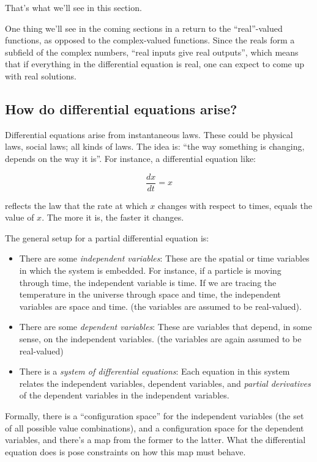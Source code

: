 \documentclass[a4paper]{amsart}
\begin{document}
That's what we'll see in this section.

One thing we'll see in the coming sections in a return to the
``real''-valued functions, as opposed to the complex-valued
functions. Since the reals form a subfield of the complex numbers,
``real inputs give real outputs'', which means that if everything in
the differential equation is real, one can expect to come up with real
solutions.

\subsection{How do differential equations arise?}

Differential equations arise from instantaneous laws. These could be
physical laws, social laws; all kinds of laws. The idea is: ``the way
something is changing, depends on the way it is''. For instance, a
differential equation like:

$$\frac{dx}{dt} = x$$

reflects the law that the rate at which $x$ changes with respect to
times, equals the value of $x$. The more it is, the faster it changes.

The general setup for a partial differential equation is:

\begin{itemize}

\item There are some {\em independent variables}: These are the
  spatial or time variables in which the system is embedded. For
  instance, if a particle is moving through time, the independent
  variable is time. If we are tracing the temperature in the universe
  through space and time, the independent variables are space and
  time. (the variables are assumed to be real-valued).

\item There are some {\em dependent variables}: These are variables
  that depend, in some sense, on the independent variables. (the
  variables are again assumed to be real-valued)

\item There is a {\em system of differential equations}: Each equation
  in this system relates the independent variables, dependent
  variables, and {\em partial derivatives} of the dependent variables
  in the independent variables.

\end{itemize}

Formally, there is a ``configuration space'' for the independent
variables (the set of all possible value combinations), and a
configuration space for the dependent variables, and there's a map
from the former to the latter. What the differential equation does is
pose constraints on how this map must behave.
\end{document}
